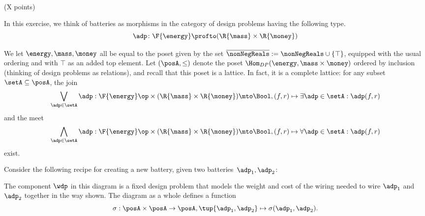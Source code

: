 \documentclass[paper=8.125in:10.250in,pagesize=pdftex,
    headinclude=false,footinclude=false,oneside,egregdoesnotlikesansseriftitles]{kaobook}
\begin{document}

\newpage


\begin{gradedexercise}\label{ex:BatteryDP} (X points)

In this exercise, we think of batteries as morphisms in the category of design problems having the following type.
    \begin{equation}
        \adp \colon \F{\energy}\profto (\R{\mass}\times \R{\money})
    \end{equation}
    \begin{center}
    \end{center}
We let $\energy,\mass,\money$ all be equal to the poset given by the set $\overline{\nonNegReals} := \nonNegReals \cup \{\top\}$, equipped with the usual ordering and with $\top$ as an added top element. Let $(\posA, \leq)$ denote the poset $\Hom_{DP}(\energy, \mass \times \money)$ ordered by inclusion (thinking of design problems as relations), and recall that this poset is a lattice. In fact, it is a complete lattice: for any subset $\setA \subseteq \posA$, the join
$$
\bigvee_{\adp \in \setA} \adp : \F{\energy}\op \times (\R{\mass}\times \R{\money}) \mto \Bool, (f, r) \mapsto \exists \adp \in \setA : \adp(f, r)
$$
and the meet
$$
\bigwedge_{\adp \in \setA} \adp : \F{\energy}\op \times (\R{\mass}\times \R{\money}) \mto \Bool, (f, r) \mapsto \forall \adp \in \setA : \adp(f, r)
$$
exist.  

Consider the following recipe for creating a new battery, given two batteries~$\adp_1,\adp_2$:
    \begin{center}
    \end{center}
The component $\wdp$ in this diagram is a fixed design problem that models the weight and cost of the wiring needed to wire $\adp_1$ and $\adp_2$ together in the way shown. The diagram as a whole defines a function 
$$
\sigma: \posA \times \posA \to \posA, \tup{\adp_1,\adp_2} \mapsto \sigma(\adp_1,\adp_2).
$$


\end{gradedexercise}
\end{document}

